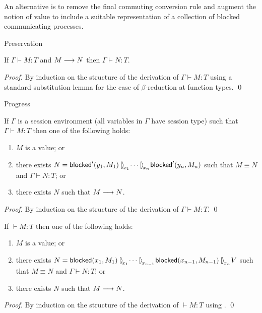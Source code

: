 \documentclass[orivec,envcountsame]{llncs}
\begin{document}
An alternative is to remove the final commuting conversion rule and augment the notion of value to
include a suitable representation of a collection of blocked communicating processes.

Preservation
\begin{theorem}
If $\Gamma \vdash M : T$ and $M \longrightarrow N$ then $\Gamma \vdash N : T$.
\end{theorem}
%
\begin{proof}
By induction on the structure of the derivation of $\Gamma \vdash M : T$ using a standard
substitution lemma for the case of $\beta$-reduction at function types. \qed
\end{proof}

Progress
\begin{theorem}
\label{thm:free-progress}
If $\Gamma$ is a session environment (all variables in $\Gamma$ have session type) such that $\Gamma
\vdash M : T$ then one of the following holds:
\begin{enumerate}
\item $M$ is a value; or
\item there exists $N = \blockedp'(y_1, M_1) \rpar{x_1} \dots \rpar{x_{n}} \blockedp'(y_{n}, M_{n})$
  such that $M \equiv N$ and $\Gamma \vdash N : T$; or
\item there exists $N$ such that $M \longrightarrow N$.
\end{enumerate}
\end{theorem}
%
\begin{proof}
By induction on the structure of the derivation of $\Gamma \vdash M : T$. \qed
\end{proof}

\begin{theorem}
If $\vdash M : T$ then one of the following holds:
\begin{enumerate}
\item $M$ is a value; or
\item there exists $N = \blockedp(x_1, M_1) \rpar{x_1} \dots \rpar{x_{n-1}} \blockedp(x_{n-1},
  M_{n-1}) \rpar{x_n} V$ such that $M \equiv N$ and $\Gamma \vdash N : T$; or
\item there exists $N$ such that $M \longrightarrow N$.
\end{enumerate}
\end{theorem}
%
\begin{proof}
By induction on the structure of the derivation of $\vdash M : T$ using
. \qed
\end{proof}
\end{document}
